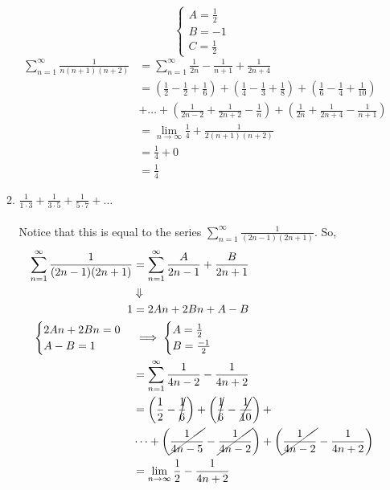 \documentclass[12pt,letterpaper]{article}
\newcommand{\limx}[2]{\displaystyle\lim\limits_{#1 \to #2}}
\theoremstyle{case}
\theoremstyle{definition}
\begin{document}
\begin{enumerate}
\begin{enumerate}
\[\begin{cases}
			A=\frac{1}{2} \\
			B=-1 \\
			C=\frac{1}{2}
			\end{cases}\]
			\begin{align*}
				\sum_{n=1}^{\infty} \frac{1}{n(n+1)(n+2)} &= \sum_{n=1}^{\infty} \frac{1}{2n} -\frac{1}{n+1} + \frac{1}{2n+4} \\
				&= \left(\frac{1}{2}-\frac{1}{2}+\frac{1}{6}\right) + \left(\frac{1}{4}-\frac{1}{3}+\frac{1}{8}\right) + \left(\frac{1}{6}-\frac{1}{4}+\frac{1}{10}\right) \\
				&+ \dots + \left(\frac{1}{2n-2}+\frac{1}{2n+2}-\frac{1}{n}\right) + \left(\frac{1}{2n}+\frac{1}{2n+4}-\frac{1}{n+1}\right) \\
				&= \limx{n}{\infty} \frac{1}{4} + \frac{1}{2(n+1)(n+2)} \\
				&= \frac{1}{4} + 0 \\
				&= \frac{1}{4}
			\end{align*}
			\item $\displaystyle\frac{1}{1 \cdot 3} + \frac{1}{3 \cdot 5} + \frac{1}{5 \cdot 7} + \dots$
			\\\\Notice that this is equal to the series $\displaystyle\sum_{n=1}^{\infty} \frac{1}{(2n-1)(2n+1)}$. So,
			\begin{align*}
				\sum_{n=1}^{\infty} \frac{1}{(2n-1)(2n+1)} &= \sum_{n=1}^{\infty} \frac{A}{2n-1} + \frac{B}{2n+1} \\
				&\Downarrow \\
				1 &= 2An+2Bn+A-B \\
				\begin{cases}
				2An+2Bn=0 \\
				A-B=1
				\end{cases} 
				&\implies
				\begin{cases}
				A= \frac{1}{2} \\
				B= \frac{-1}{2}
				\end{cases} \\
				&= \sum_{n=1}^{\infty} \frac{1}{4n-2} - \frac{1}{4n+2} \\
				&= \left(\frac{1}{2}-\cancel{\frac{1}{6}}\right) + \left(\cancel{\frac{1}{6}}-\cancel{\frac{1}{10}}\right) + \\
				&\dots + \left(\cancel{\frac{1}{4n-5}}-\cancel{\frac{1}{4n-2}}\right) + \left(\cancel{\frac{1}{4n-2}}-\frac{1}{4n+2}\right) \\
				&=\limx{n}{\infty} \frac{1}{2} -\frac{1}{4n+2} \\

\end{align*}
\end{enumerate}
\end{enumerate}
\end{document}
